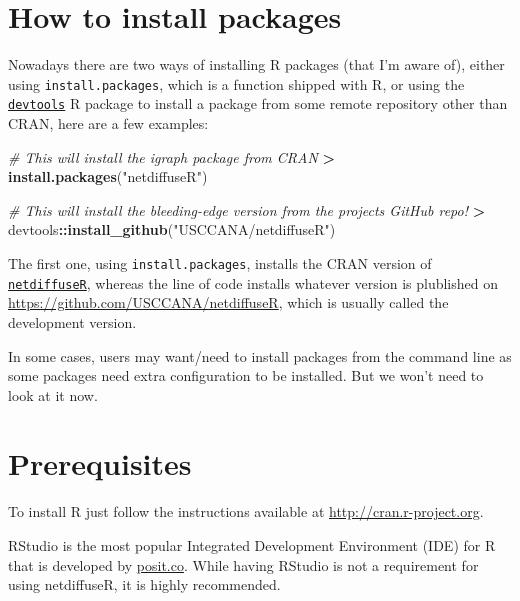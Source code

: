 \documentclass[
]{book}
\newenvironment{Shaded}{\begin{snugshade}}{\end{snugshade}}
\newcommand{\CommentTok}[1]{\textcolor[rgb]{0.56,0.35,0.01}{\textit{#1}}}
\newcommand{\FunctionTok}[1]{\textcolor[rgb]{0.13,0.29,0.53}{\textbf{#1}}}
\newcommand{\NormalTok}[1]{#1}
\newcommand{\SpecialCharTok}[1]{\textcolor[rgb]{0.81,0.36,0.00}{\textbf{#1}}}
\newcommand{\StringTok}[1]{\textcolor[rgb]{0.31,0.60,0.02}{#1}}
\begin{document}
\hypertarget{how-to-install-packages}{%
\section{How to install packages}\label{how-to-install-packages}}

Nowadays there are two ways of installing R packages (that I'm aware of), either using \texttt{install.packages}, which is a function shipped with R, or using the \href{https://cran.r-project.org/package=devtools}{\texttt{devtools}} R package to install a package from some remote repository other than CRAN, here are a few examples:

\begin{Shaded}
\begin{Highlighting}[]
\CommentTok{\# This will install the igraph package from CRAN}
\SpecialCharTok{\textgreater{}} \FunctionTok{install.packages}\NormalTok{(}\StringTok{"netdiffuseR"}\NormalTok{)}

\CommentTok{\# This will install the bleeding{-}edge version from the project\textquotesingle{}s GitHub repo!}
\SpecialCharTok{\textgreater{}}\NormalTok{ devtools}\SpecialCharTok{::}\FunctionTok{install\_github}\NormalTok{(}\StringTok{"USCCANA/netdiffuseR"}\NormalTok{)}
\end{Highlighting}
\end{Shaded}

The first one, using \texttt{install.packages}, installs the CRAN version of \href{https://r-project.org/package=netdiffuseR}{\texttt{netdiffuseR}}, whereas the line of code installs whatever version is plublished on \url{https://github.com/USCCANA/netdiffuseR}, which is usually called the development version.

In some cases, users may want/need to install packages from the command line as some packages need extra configuration to be installed. But we won't need to look at it now.

\hypertarget{prerequisites}{%
\section{Prerequisites}\label{prerequisites}}

To install R just follow the instructions available at \url{http://cran.r-project.org}.

RStudio is the most popular Integrated Development Environment (IDE) for R that is developed by \href{https://posit.co}{posit.co}. While having RStudio is not a requirement for using netdiffuseR, it is highly recommended.
\end{document}
